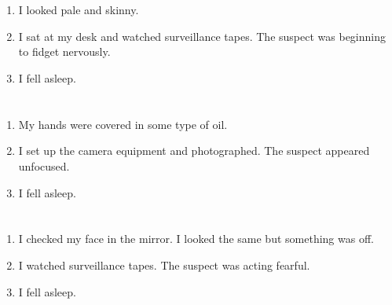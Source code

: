 \documentclass{article}
\begin{document}
    \newpage
    
    \section{}
    
    \begin{enumerate}
    
    \item I looked pale and skinny.\\
    
    \item I sat at my desk and watched surveillance tapes. The suspect was beginning to fidget nervously.\\
    
    \item I fell asleep.\\
    
    \end{enumerate}
     
    \newpage
    
    \section{}
    
    \begin{enumerate}
    
    \item My hands were covered in some type of oil.\\
    
    \item I set up the camera equipment and photographed. The suspect appeared unfocused.\\
    
    \item I fell asleep.\\
    
    \end{enumerate}
     
    \newpage
    
    \section{}
    
    \begin{enumerate}
    
    \item I checked my face in the mirror. I looked the same but something was off.\\
    
    \item I watched surveillance tapes. The suspect was acting fearful.\\
    
    \item I fell asleep.\\
    
    \end{enumerate}
     
\end{document}
